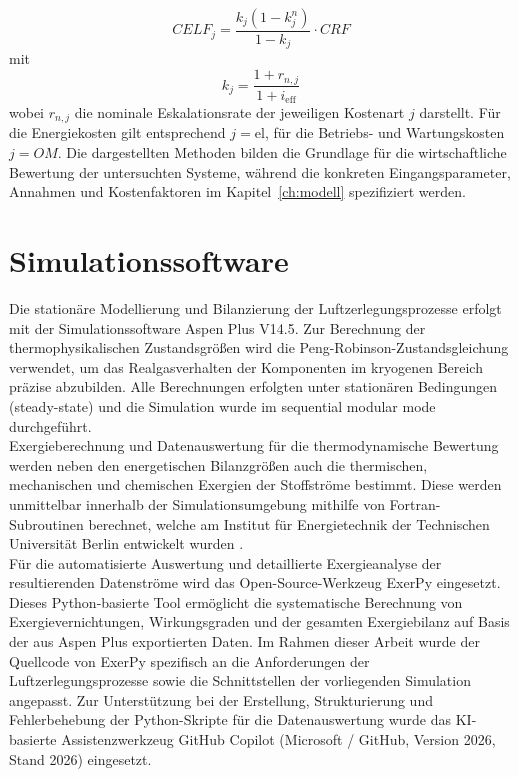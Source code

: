 \begin{equation}
CELF_j =
\frac{k_j(1-k_j^n)}{1-k_j} \cdot CRF
\end{equation}
mit
\begin{equation}
k_j = \frac{1+r_{n,j}}{1+i_\mathrm{eff}}
\end{equation}
wobei $r_{n,j}$ die nominale Eskalationsrate der jeweiligen Kostenart $j$ darstellt. Für die Energiekosten gilt entsprechend $j=\mathrm{el}$, für die Betriebs- und Wartungskosten $j=OM$. Die dargestellten Methoden bilden die Grundlage für die wirtschaftliche Bewertung der untersuchten Systeme, während die konkreten Eingangsparameter, Annahmen und Kostenfaktoren im Kapitel~\ref{ch:modell} spezifiziert werden.


\section{Simulationssoftware}
\label{sec:simulationssoftware}

Die stationäre Modellierung und Bilanzierung der Luftzerlegungsprozesse erfolgt mit der Simulationssoftware Aspen Plus V14.5. Zur Berechnung der thermophysikalischen Zustandsgrößen wird die Peng-Robinson-Zustandsgleichung verwendet, um das Realgasverhalten der Komponenten im kryogenen Bereich präzise abzubilden. Alle Berechnungen erfolgten unter stationären Bedingungen (steady-state) und die Simulation wurde im sequential modular mode durchgeführt. \\
Exergieberechnung und Datenauswertung für die thermodynamische Bewertung werden neben den energetischen Bilanzgrößen auch die thermischen, mechanischen und chemischen Exergien der Stoffströme bestimmt. Diese werden unmittelbar innerhalb der Simulationsumgebung mithilfe von Fortran-Subroutinen berechnet, welche am Institut für Energietechnik der Technischen Universität Berlin entwickelt wurden \cite{TUB_ExergySubroutine_2017}. \\
Für die automatisierte Auswertung und detaillierte Exergieanalyse der resultierenden Datenströme wird das Open-Source-Werkzeug ExerPy \cite{ExerPy} eingesetzt. Dieses Python-basierte Tool ermöglicht die systematische Berechnung von Exergievernichtungen, Wirkungsgraden und der gesamten Exergiebilanz auf Basis der aus Aspen Plus exportierten Daten. Im Rahmen dieser Arbeit wurde der Quellcode von ExerPy spezifisch an die Anforderungen der Luftzerlegungsprozesse sowie die Schnittstellen der vorliegenden Simulation angepasst. Zur Unterstützung bei der Erstellung, Strukturierung und Fehlerbehebung der Python-Skripte für die Datenauswertung wurde das KI-basierte Assistenzwerkzeug GitHub Copilot (Microsoft / GitHub, Version 2026, Stand 2026) eingesetzt. \\

